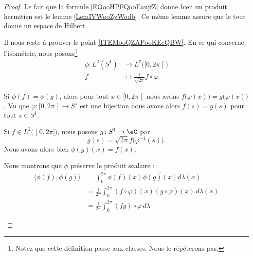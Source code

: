 \begin{proof}
    Le fait que la formule \eqref{EQooHPFQooEaujfZ} donne bien un produit hermitien est le lemme \ref{LemIVWooZyWodb}. Ce même lemme assure que le tout donne un espace de Hilbert.

    Il nous reste à prouver le point \ref{ITEMooQZAPooKEeQBW}. En ce qui concerne l'isométrie, nous posons\footnote{Notez que cette définition passe aux classes. Nous le répéterons pas.}
    \begin{equation}
        \begin{aligned}
            \phi\colon L^2(S^1)&\to L^2\big( \mathopen[ 0 , 2\pi \mathclose[ \big) \\
                f&\mapsto \frac{1}{ \sqrt{ 2\pi } }f\circ \varphi.
        \end{aligned}
    \end{equation}
    \begin{subproof}
        \item[Injection]
            Si \( \phi(f)=\phi(g)\), alors pour tout \( x\in\mathopen[ 0 , 2\pi \mathclose[\) nous avons \( f\big( \varphi(x) \big)=g\big( \varphi(x) \big)\). Vu que \( \varphi\colon \mathopen[ 0 , 2\pi \mathclose[\to S^1\) est une bijection nous avons alors \( f(s)=g(s)\) pour tout \( s\in S^1\).
            \item[Surjection]
            Si \( f\in L^2\big( \mathopen] 0 , 2\pi \mathclose] \big)\), nous posons \( g\colon S^1\to \eC\) par
            \begin{equation}
                g(s)=\sqrt{ 2\pi }f\big( \varphi^{-1}(s) \big).
            \end{equation}
            Nous avons alors bien \( \phi(g)(x)=f(x)\).
        \item[Isométrie]
            Nous montrons que \( \phi\) préserve le produit scalaire :
            \begin{subequations}        \label{SUBEQSooRYYHooPcLXHN}
                \begin{align}
                    \langle \phi(f), \phi(g)\rangle &=\int_0^{2\pi}\phi(f)(x)\overline{ \phi(g)(x) }d\lambda(x)\\
                    &=\frac{1}{ 2\pi }\int_0^{2\pi}(f\circ\varphi)(x)\overline{ (g\circ\varphi)(x) }\,d\lambda(x)\\
                    &=\frac{1}{ 2\pi }\int_0^{2\pi}(fg)\circ\varphi\, d\lambda
                \end{align}
            \end{subequations}

\end{subproof}
\end{proof}
